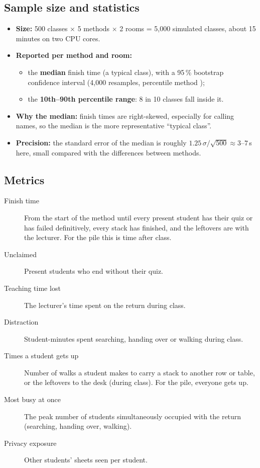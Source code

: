 \documentclass[11pt,a4paper]{article}
\begin{document}
\subsection{Sample size and statistics}
\begin{itemize}
  \item \textbf{Size:} 500 classes $\times$ 5 methods $\times$ 2 rooms = 5{,}000 simulated classes, about 15 minutes on two CPU cores.
  \item \textbf{Reported per method and room:}
  \begin{itemize}
    \item the \textbf{median} finish time (a typical class), with a 95\,\% bootstrap confidence interval (4{,}000 resamples, percentile method \cite{efron1993});
    \item the \textbf{10th--90th percentile range}: 8 in 10 classes fall inside it.
  \end{itemize}
  \item \textbf{Why the median:} finish times are right-skewed, especially for calling names, so the median is the more representative ``typical class''.
  \item \textbf{Precision:} the standard error of the median is roughly $1.25\,\sigma/\sqrt{500} \approx 3$--$7$\,s here, small compared with the differences between methods.
\end{itemize}

\subsection{Metrics}
\begin{description}
  \item[Finish time] From the start of the method until every present student has their quiz or has failed definitively, every stack has finished, and the leftovers are with the lecturer. For the pile this is time after class.
  \item[Unclaimed] Present students who end without their quiz.
  \item[Teaching time lost] The lecturer's time spent on the return during class.
  \item[Distraction] Student-minutes spent searching, handing over or walking during class.
  \item[Times a student gets up] Number of walks a student makes to carry a stack to another row or table, or the leftovers to the desk (during class). For the pile, everyone gets up.
  \item[Most busy at once] The peak number of students simultaneously occupied with the return (searching, handing over, walking).
  \item[Privacy exposure] Other students' sheets seen per student.
\end{description}
\end{document}
